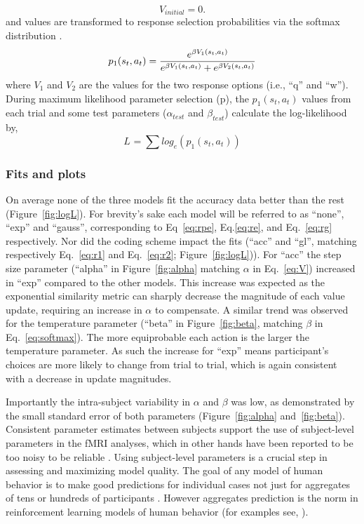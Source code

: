 \begin{equation} \label{eq:V0} V_{initial} = 0. \end{equation}
and values are transformed to response selection probabilities via the softmax distribution \citep{Sutton:1998p9247,ODoherty:2003p6329}.
\begin{equation}
    \label{eq:softmax}
    p_1(s_t,a_t) = {e^{\beta V_1(s_t,a_t)}\over{e^{\beta V_1(s_t,a_t)} + e^{\beta V_2(s_t,a_t)}}}
\end{equation}
where $V_1$ and $V_2$ are the values for the two response options (i.e., ``q'' and ``w'').
During maximum likelihood parameter selection (p\pageref{subsub:codesandfits}), the $p_1(s_t,a_t)$ values from each trial and some test parameters ($\alpha_{test}$ and $\beta_{test}$) calculate the log-likelihood by,
\begin{equation}
    \label{eq:logL}
    L_{} = \sum{log_e(p_1(s_t,a_t))}
\end{equation}

\subsubsection{Fits and plots}
\label{subsub:fits}
On average none of the three models fit the accuracy data better than the rest (Figure~\ref{fig:logL}).  For brevity's sake each model will be referred to as ``none'', ``exp'' and ``gauss'', corresponding to Eq~\ref{eq:rpe}, Eq.\ref{eq:re}, and Eq.~\ref{eq:rg} respectively.  Nor did the coding scheme impact the fits (``acc'' and ``gl'', matching respectively Eq.~\ref{eq:r1} and Eq.~\ref{eq:r2}; Figure~\ref{fig:logL})).  For ``acc'' the step size parameter (``alpha'' in Figure~\ref{fig:alpha} matching $\alpha$ in Eq.~\ref{eq:V}) increased in ``exp'' compared to the other models.  This increase was expected as the exponential similarity metric can sharply decrease the magnitude of each value update, requiring an increase in $\alpha$ to compensate.  A similar trend was observed for the temperature parameter (``beta'' in Figure~\ref{fig:beta}, matching $\beta$ in Eq.~\ref{eq:softmax}). The more equiprobable each action is the larger the temperature parameter.  As such the increase for ``exp'' means participant's choices are more likely to change from trial to trial, which is again consistent with a decrease in update magnitudes.

Importantly the intra-subject variability in $\alpha$ and $\beta$ was low, as demonstrated by the small standard error of both parameters (Figure~\ref{fig:alpha} and~\ref{fig:beta}).  Consistent parameter estimates between subjects support the use of subject-level parameters in the fMRI analyses, which in other hands have been reported to be too noisy to be reliable \citep{Daw:2011p7995,Seymour:2007p7585,ODoherty:2003p6329}.  Using subject-level parameters is a crucial step in assessing and maximizing model quality. The goal of any model of human behavior is to make good predictions for individual cases not just for aggregates of tens or hundreds of participants \citep{Daw:2007p9346}.  However aggregates prediction is the norm in reinforcement learning models of human behavior (for examples see, \citep{Daw:2011p7995,Seymour:2007p7585,ODoherty:2003p6329}).

